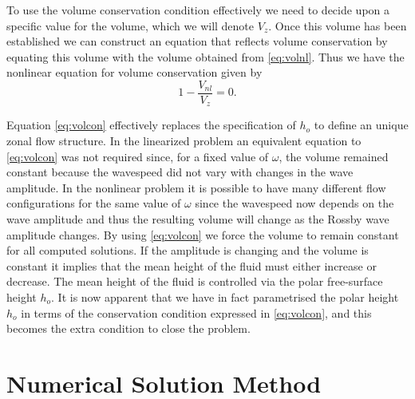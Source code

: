 To use the volume conservation condition effectively we need to decide upon a specific value for the volume, which we will denote $V_z$. Once this volume has been established we can construct an equation that reflects volume conservation by equating this volume with the volume obtained from \eqref{eq:volnl}. Thus we have the nonlinear equation for volume conservation given by
\begin{equation}
1-\frac{V_{nl}}{V_z}=0. \label{eq:volcon}
\end{equation}

Equation \eqref{eq:volcon} effectively replaces the specification of $h_o$ to define an unique zonal flow structure. In the linearized problem an equivalent equation to \eqref{eq:volcon} was not required since, for a fixed value of $\omega$, the volume remained constant because the wavespeed did not vary with changes in the wave amplitude. In the nonlinear problem it is possible to have many different flow configurations for the same value of $\omega$ since the wavespeed now depends on the wave amplitude and thus the resulting volume will change as the Rossby wave amplitude changes. By using \eqref{eq:volcon} we force the volume to remain constant for all computed solutions. If the amplitude is changing and the volume is constant it implies that the mean height of the fluid must either increase or decrease. The mean height of the fluid is controlled via the polar free-surface height $h_o$. It is now apparent that we have in fact parametrised the polar height $h_o$ in terms of the conservation condition expressed in \eqref{eq:volcon}, and this becomes the extra condition to close the problem.

\section{Numerical Solution Method}
